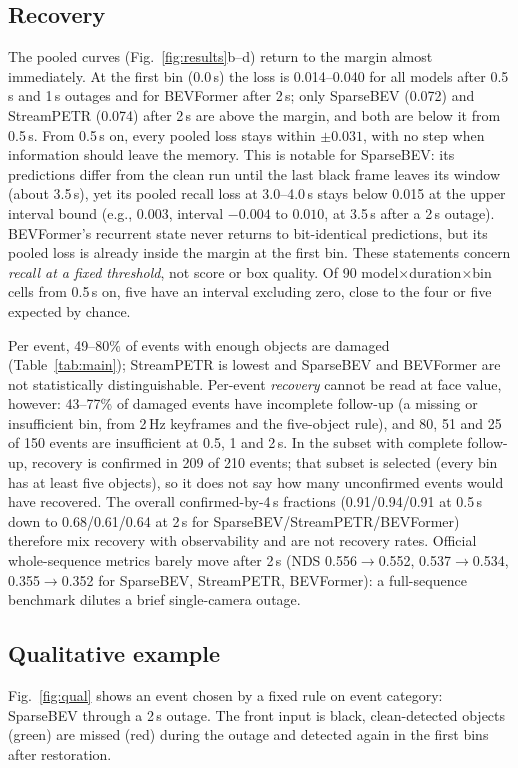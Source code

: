 \documentclass[letterpaper, 10 pt, conference]{ieeeconf}
\begin{document}
\subsection{Recovery}
The pooled curves (Fig.~\ref{fig:results}b--d) return to the margin almost immediately. At the first bin (0.0\,s) the loss is 0.014--0.040 for all models after 0.5\,s and 1\,s outages
and for BEVFormer after 2\,s; only SparseBEV (0.072) and StreamPETR (0.074) after 2\,s are above the margin, and both are below it from 0.5\,s. From 0.5\,s on, every pooled loss stays within $\pm0.031$,
with no step when information should leave the memory. This is notable for SparseBEV: its predictions differ from the clean run until the last black frame leaves its window (about 3.5\,s),
yet its pooled recall loss at 3.0--4.0\,s stays below 0.015 at the upper interval bound (e.g., 0.003, interval $-0.004$ to $0.010$, at 3.5\,s after a 2\,s outage). BEVFormer's recurrent state never returns to bit-identical predictions, but its
pooled loss is already inside the margin at the first bin. These statements concern \emph{recall at a fixed threshold}, not score or box quality. Of 90 model$\times$duration$\times$bin cells from 0.5\,s on, five have an interval excluding zero,
close to the four or five expected by chance.

Per event, 49--80\% of events with enough objects are damaged (Table~\ref{tab:main}); StreamPETR is lowest and SparseBEV and BEVFormer are not statistically distinguishable. Per-event \emph{recovery} cannot be read at face value, however:
43--77\% of damaged events have incomplete follow-up (a missing or insufficient bin, from 2\,Hz keyframes and the five-object rule), and 80, 51 and 25 of 150 events are insufficient at 0.5, 1 and 2\,s. In the subset with complete follow-up, recovery is confirmed in 209 of 210 events; that subset is selected (every bin has at least five objects), so it does not say how many unconfirmed events would have recovered.
The overall confirmed-by-4\,s fractions (0.91/0.94/0.91 at 0.5\,s down to 0.68/0.61/0.64 at 2\,s for SparseBEV/StreamPETR/BEVFormer) therefore mix recovery with observability and are not recovery rates.
Official whole-sequence metrics barely move after 2\,s (NDS 0.556$\to$0.552, 0.537$\to$0.534, 0.355$\to$0.352 for SparseBEV, StreamPETR, BEVFormer): a full-sequence benchmark dilutes a brief single-camera outage.

\subsection{Qualitative example}
Fig.~\ref{fig:qual} shows an event chosen by a fixed rule on event category: SparseBEV through a 2\,s outage. The front input is black, clean-detected objects (green) are missed (red) during the outage and detected again in the first bins after restoration.
\end{document}
